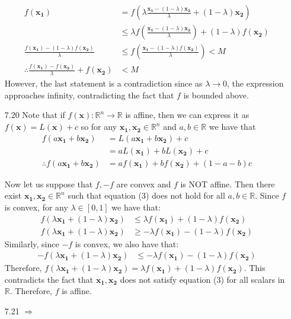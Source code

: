 \documentclass[letterpaper,12pt]{article}
\theoremstyle{definition}
\begin{document}
\begin{enumerate}
    \begin{align*}
      f(\mathbf{x_1}) &= f(\lambda\frac{\mathbf{x_1}-(1-\lambda)\mathbf{x_2}}{\lambda}+(1-\lambda)\mathbf{x_2}) \\
      &\leq \lambda f(\frac{\mathbf{x_1}-(1-\lambda)\mathbf{x_2}}{\lambda})+(1-\lambda)f(\mathbf{x_2}) \\
      \frac{f(\mathbf{x_1})-(1-\lambda)f(\mathbf{x_2})}{\lambda} &\leq f(\frac{\mathbf{x_1}-(1-\lambda)f(\mathbf{x_2})}{\lambda}) < M \\
      \therefore \frac{f(\mathbf{x_1})-f(\mathbf{x_2})}{\lambda} + f(\mathbf{x_2}) &< M
    \end{align*}
    However, the last statement is a contradiction since as $\lambda \rightarrow 0$, the expression approaches infinity, contradicting the fact that $f$ is bounded above.
  \item[7.20]
    Note that if $f(\mathbf{x}):\mathbb{R}^n\rightarrow\mathbb{R}$ is affine, then we can express it as $f(\mathbf{x}) = L(\mathbf{x})+c$ so for any $\mathbf{x_1},\mathbf{x_2}\in\mathbb{R}^n$ and $a,b\in\mathbb{R}$ we have that
    \begin{align}
      f(a\mathbf{x_1}+b\mathbf{x_2}) &= L(a\mathbf{x_1}+b\mathbf{x_2})+c \\
      &=aL(\mathbf{x_1})+bL(\mathbf{x_2})+c \\
      \therefore f(a\mathbf{x_1}+b\mathbf{x_2}) &= af(\mathbf{x_1})+bf(\mathbf{x_2})+(1-a-b)c
    \end{align}

    Now let us suppose that $f, -f$ are convex and $f$ is NOT affine. Then there exist $\mathbf{x_1},\mathbf{x_2}\in\mathbb{R}^n$ such that equation (3) does not hold for all $a,b\in\mathbb{R}$. Since $f$ is convex, for any $\lambda\in[0,1]$ we have that:
    \begin{align*}
      f(\lambda\mathbf{x_1}+(1-\lambda)\mathbf{x_2}) &\leq \lambda f(\mathbf{x_1})+(1-\lambda)f(\mathbf{x_2}) \\
      f(\lambda\mathbf{x_1}+(1-\lambda)\mathbf{x_2}) &\geq -\lambda f(\mathbf{x_1})-(1-\lambda)f(\mathbf{x_2})
    \end{align*}
    Similarly, since $-f$ is convex, we also have that:
    \begin{align*}
      -f(\lambda\mathbf{x_1}+(1-\lambda)\mathbf{x_2}) &\leq -\lambda f(\mathbf{x_1})-(1-\lambda)f(\mathbf{x_2})
    \end{align*}
    Therefore, $f(\lambda\mathbf{x_1}+(1-\lambda)\mathbf{x_2}) = \lambda f(\mathbf{x_1})+(1-\lambda)f(\mathbf{x_2})$. This contradicts the fact that $\mathbf{x_1},\mathbf{x_2}$ does not satisfy equation (3) for all scalars in $\mathbb{R}$. Therefore, $f$ is affine.
  \item[7.21]
    $\Longrightarrow$


\end{enumerate}
\end{document}
